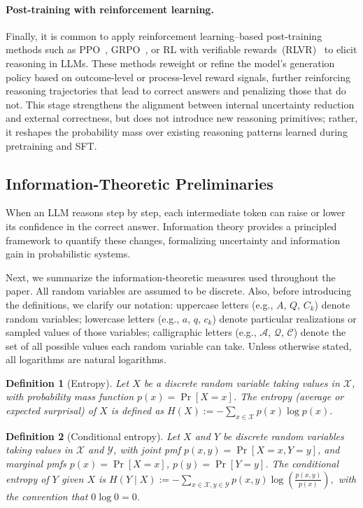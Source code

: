 \documentclass{article}
\newtheorem{definition}{Definition}
\begin{document}
\paragraph{Post-training with reinforcement learning.} Finally, it is common to apply reinforcement learning–based post-training methods such as PPO~\citep{schulman2017proximal}, GRPO~\citep{shao2024deepseekmath}, or RL with verifiable rewards~(RLVR)~\citep{wen2025reinforcementlearningverifiablerewards} to elicit reasoning in LLMs. These methods reweight or refine the model’s generation policy based on outcome-level or process-level reward signals, further reinforcing reasoning trajectories that lead to correct answers and penalizing those that do not. This stage strengthens the alignment between internal uncertainty reduction and external correctness, but does not introduce new reasoning primitives; rather, it reshapes the probability mass over existing reasoning patterns learned during pretraining and SFT.

\subsection{Information-Theoretic Preliminaries}

When an LLM reasons step by step, each intermediate token can raise or lower its confidence in the correct answer. Information theory provides a principled framework to quantify these changes, formalizing uncertainty and information gain in probabilistic systems.

Next, we summarize the information-theoretic measures used throughout the paper. All random variables are assumed to be discrete. Also, before introducing the definitions, we clarify our notation: uppercase letters (e.g., $A$, $Q$, $C_k$) denote random variables; lowercase letters (e.g., $a$, $q$, $c_k$) denote particular realizations or sampled values of those variables; calligraphic letters (e.g., $\mathcal{A}$, $\mathcal{Q}$, $\mathcal{C}$) denote the set of all possible values each random variable can take. Unless otherwise stated, all logarithms are natural logarithms.

\begin{definition}[Entropy]
    Let $X$ be a discrete random variable taking values in $\mathcal{X}$, with probability mass function $p(x)=\Pr[X=x]$. The entropy (average or expected surprisal) of $X$ is defined as $H(X):=-\sum_{x\in\mathcal{X}} p(x)\log p(x).$
\end{definition}

\begin{definition}[Conditional entropy]
    Let $X$ and $Y$ be discrete random variables taking values in $\mathcal{X}$ and $\mathcal{Y}$, with joint pmf $p(x,y)=\Pr[X=x,Y=y]$, and marginal pmfs $p(x)=\Pr[X=x]$, $p(y)=\Pr[Y=y]$. The \emph{conditional entropy} of $Y$ given $X$ is $H(Y\mid X):=-\sum_{x\in\mathcal{X},y\in\mathcal{Y}}p(x,y)\log \left(\frac{p(x,y)}{p(x)}\right),$
    with the convention that $0\log0=0$.
\end{definition}
\end{document}
